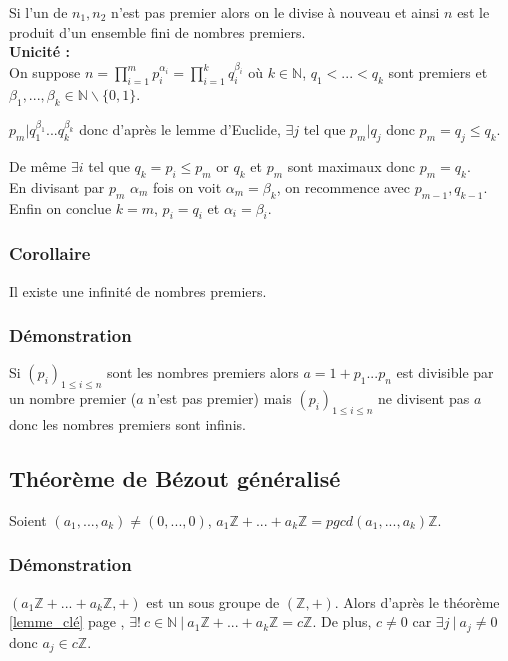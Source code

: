 \documentclass[a4paper,10pt]{book} %
\newcommand{\N}{\mathbb{N}}
\newcommand{\Z}{\mathbb{Z}}
\newcommand{\tq}{~|~}
\begin{document}
Si l'un de $n_1,n_2$ n'est pas premier alors on le divise à nouveau et ainsi $n$ est le produit d'un ensemble fini de nombres premiers.\\

\textbf{Unicité :}\\
On suppose $\displaystyle n=\prod_{i=1}^mp_i^{\alpha_i}=\prod_{i=1}^kq_i^{\beta_i}$ où $k\in\N$, $q_1<...<q_k$ sont premiers et $\beta_1,...,\beta_k\in\N\backslash\{0,1\}$.\\\smallskip

$p_m | q_1^{\beta_1}...q_k^{\beta_k}$ donc d'après le lemme d'Euclide, $\exists j$ tel que $p_m|q_j$ donc $p_m=q_j \leq q_k$.

De même $\exists i$ tel que $q_k=p_i\leq  p_m$ or $q_k$ et $p_m$ sont maximaux donc $p_m=q_k$.\\
En divisant par $p_m$ $\alpha_m$ fois on voit $\alpha_m=\beta_k$, on recommence avec $p_{m-1}, q_{k-1}$.\\
Enfin on conclue $k=m$, $p_i=q_i$ et $\alpha_i=\beta_i$.

\subsubsection{Corollaire}
Il existe une infinité de nombres premiers.

\subsubsection{Démonstration}
Si $(p_i)_{1\leq i \leq n}$ sont les nombres premiers alors $a=1+p_1...p_n$ est divisible par un nombre premier ($a$ n'est pas premier) mais $(p_i)_{1\leq i \leq n}$ ne divisent pas $a$ donc les nombres premiers sont infinis.

\newpage

\subsection{Théorème de Bézout généralisé}
Soient $(a_1,...,a_k)\neq (0,...,0)$, $a_1\Z+...+a_k\Z=pgcd(a_1,...,a_k)\Z$.

\subsubsection{Démonstration}
$(a_1\Z+...+a_k\Z,+)$ est un sous groupe de $(\Z,+)$. Alors d'après le théorème \ref{lemme_clé} page \pageref{lemme_clé}, $\exists !~c \in \N \tq a_1\Z+...+a_k\Z=c\Z$. De plus, $c\neq 0$ car $\exists j\tq a_j\neq 0$ donc $a_j\in c\Z$.\\
\end{document}
